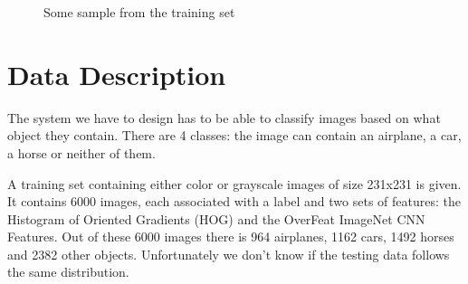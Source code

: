 \documentclass{article} %
\begin{document}
\begin{figure}[!t]
	\centering
	\caption{Some sample from the training set}
\end{figure}

\section{Data Description}

The system we have to design has to be able to classify images based on what object they contain. 
There are 4 classes: the image can contain an airplane, a car, a horse or neither of them.

A training set containing either color or grayscale images of size 231x231 is given. It contains 6000 images, each associated with a label and two sets of features: the Histogram of Oriented Gradients (HOG) and the OverFeat ImageNet CNN Features.
Out of these 6000 images there is 964 airplanes, 1162 cars, 1492 horses and 2382 other objects.
Unfortunately we don't know if the testing data follows the same distribution.
\end{document}
